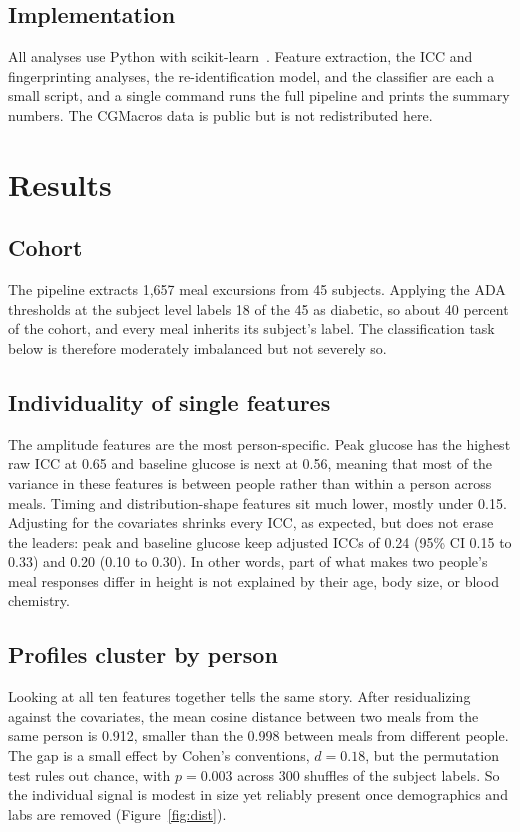 \documentclass[10pt,conference,compsoc]{IEEEtran}
\begin{document}
\subsection{Implementation}
All analyses use Python with scikit-learn~\cite{pedregosa2011}. Feature
extraction, the ICC and fingerprinting analyses, the re-identification model, and
the classifier are each a small script, and a single command runs the full
pipeline and prints the summary numbers. The CGMacros data is public but is not
redistributed here.

\section{Results}

\subsection{Cohort}
The pipeline extracts 1{,}657 meal excursions from 45 subjects. Applying the ADA
thresholds at the subject level labels 18 of the 45 as diabetic, so about 40
percent of the cohort, and every meal inherits its subject's label. The
classification task below is therefore moderately imbalanced but not severely so.

\subsection{Individuality of single features}
The amplitude features are the most person-specific. Peak glucose has the highest
raw ICC at 0.65 and baseline glucose is next at 0.56, meaning that most of the
variance in these features is between people rather than within a person across
meals. Timing and distribution-shape features sit much lower, mostly under 0.15.
Adjusting for the covariates shrinks every ICC, as expected, but does not erase
the leaders: peak and baseline glucose keep adjusted ICCs of 0.24 (95\% CI 0.15
to 0.33) and 0.20 (0.10 to 0.30). In
other words, part of what makes two people's meal responses differ in height is
not explained by their age, body size, or blood chemistry.

\subsection{Profiles cluster by person}
Looking at all ten features together tells the same story. After residualizing
against the covariates, the mean cosine distance between two meals from the same
person is 0.912, smaller than the 0.998 between meals from different people. The
gap is a small effect by Cohen's conventions, $d = 0.18$, but the permutation
test rules out chance, with $p = 0.003$ across 300 shuffles of the subject
labels. So the individual signal is modest in size yet reliably present once
demographics and labs are removed (Figure~\ref{fig:dist}).
\end{document}
